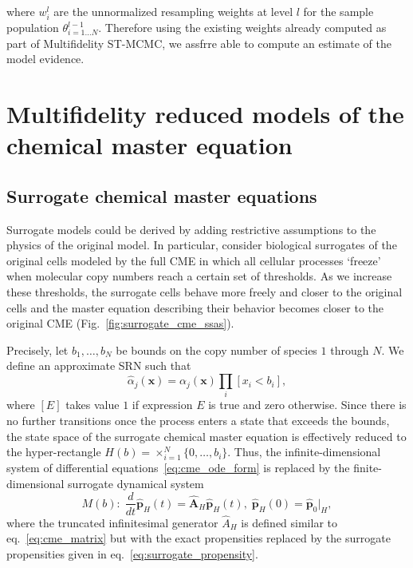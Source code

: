 \documentclass[1p]{article}
\begin{document}
where $w_i^l$ are the unnormalized resampling weights at level $l$ for the sample population $\theta_{i=1 \dots N}^{l-1}$. Therefore using the existing weights already computed as part of Multifidelity ST-MCMC, we assfrre able to compute an estimate of the model evidence.

\section{Multifidelity reduced models of the chemical master equation}
\subsection{Surrogate chemical master equations}
\label{sec:surrogate_cme}
Surrogate models could be derived by adding restrictive assumptions to the physics of the original model.
In particular, consider biological surrogates of the original cells modeled by the full CME in which all cellular processes `freeze' when molecular copy numbers reach a certain set of thresholds.
As we increase these thresholds, the surrogate cells behave more freely and closer to the original cells and the master equation describing their behavior becomes closer to the original CME (Fig.~\ref{fig:surrogate_cme_ssas}).

Precisely, let $b_1, \ldots, b_N$ be bounds on the copy number of species $1$ through $N$. We define an approximate SRN such that
\begin{equation}
  \label{eq:surrogate_propensity}
  \hat{\alpha}_j(\bm{x})
  =
  \alpha_j(\bm{x})\prod_{i}[x_i < b_i],
\end{equation}
where $[E]$ takes value $1$ if expression $E$ is true and zero otherwise.
Since there is no further transitions once the process enters a state that exceeds the bounds, the state space of the surrogate chemical master equation  is effectively reduced to the hyper-rectangle $H(b) = \times_{i=1}^{N}\{0,\ldots, b_i\}$.
Thus, the infinite-dimensional system of differential equations~\eqref{eq:cme_ode_form} is replaced by the finite-dimensional surrogate dynamical system
\begin{equation}
  \label{eq:surrogate_cme}
  M(b):\;
  \frac{d}{dt}{\widehat{\bm{p}}_{H}(t)}
  =
  \widehat{\bm{A}}_{H}
  \widehat{\bm{p}}_{H}(t),
  \;
  \widehat{\bm{p}}_{H}(0) = \widehat{\bm{p}}_0 \vert_{H},
\end{equation}
where the truncated infinitesimal generator $\widehat{A}_{H}$ is defined similar to eq.~\eqref{eq:cme_matrix} but with the exact propensities replaced by the surrogate propensities given in eq.~\eqref{eq:surrogate_propensity}.
\end{document}
